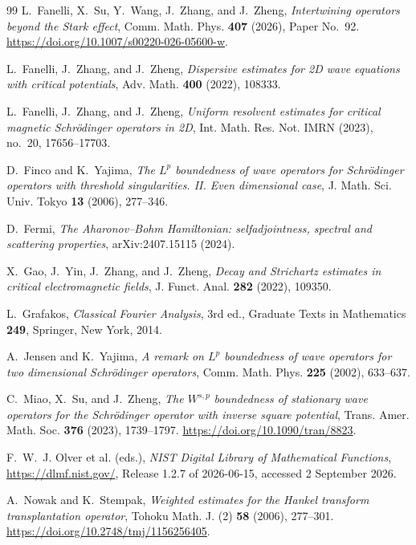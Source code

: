 \documentclass[11pt,a4paper,reqno,backref=page]{amsart}
\numberwithin{equation}{section}
\theoremstyle{definition}
\theoremstyle{remark}
\begin{document}
\begin{thebibliography}{99}
 L.~Fanelli, X.~Su, Y.~Wang, J.~Zhang, and
J.~Zheng, \emph{Intertwining operators beyond the Stark effect},
Comm. Math. Phys. \textbf{407} (2026), Paper No.~92.
\url{https://doi.org/10.1007/s00220-026-05600-w}.

 L.~Fanelli, J.~Zhang, and J.~Zheng,
\emph{Dispersive estimates for 2D wave equations with critical
potentials}, Adv. Math. \textbf{400} (2022), 108333.

 L.~Fanelli, J.~Zhang, and J.~Zheng,
\emph{Uniform resolvent estimates for critical magnetic
Schr\"odinger operators in 2D}, Int. Math. Res. Not. IMRN
(2023), no.~20, 17656--17703.

 D.~Finco and K.~Yajima, \emph{The
$L^p$ boundedness of wave operators for Schr\"odinger operators
with threshold singularities. II\@. Even dimensional case}, J.
Math. Sci. Univ. Tokyo \textbf{13} (2006), 277--346.

 D.~Fermi, \emph{The Aharonov--Bohm
Hamiltonian: selfadjointness, spectral and scattering
properties}, arXiv:2407.15115 (2024).

 X.~Gao, J.~Yin, J.~Zhang, and J.~Zheng,
\emph{Decay and Strichartz estimates in critical electromagnetic
fields}, J. Funct. Anal. \textbf{282} (2022), 109350.

 L.~Grafakos, \emph{Classical Fourier
Analysis}, 3rd ed., Graduate Texts in Mathematics \textbf{249},
Springer, New York, 2014.

 A.~Jensen and K.~Yajima, \emph{A
remark on $L^p$ boundedness of wave operators for two
dimensional Schr\"odinger operators}, Comm. Math. Phys.
\textbf{225} (2002), 633--637.

 C.~Miao, X.~Su, and J.~Zheng, \emph{The
$W^{s,p}$ boundedness of stationary wave operators for the
Schr\"odinger operator with inverse square potential}, Trans.
Amer. Math. Soc. \textbf{376} (2023), 1739--1797.
\url{https://doi.org/10.1090/tran/8823}.

 F.~W.~J. Olver et al. (eds.), \emph{NIST Digital
Library of Mathematical Functions},
\url{https://dlmf.nist.gov/}, Release 1.2.7 of 2026-06-15,
accessed 2 September 2026.

 A.~Nowak and K.~Stempak,
\emph{Weighted estimates for the Hankel transform
transplantation operator}, Tohoku Math. J. (2) \textbf{58}
(2006), 277--301. \url{https://doi.org/10.2748/tmj/1156256405}.


\end{thebibliography}
\end{document}
